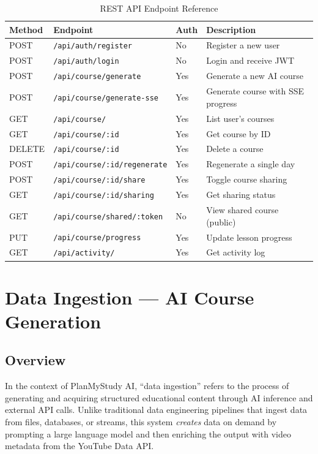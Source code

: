 \documentclass[12pt,a4paper]{report}
\begin{document}
\begin{table}[H]
\centering
\caption{REST API Endpoint Reference}
\label{tab:api-endpoints}
\begin{tabularx}{\textwidth}{l l l X}
\toprule
\textbf{Method} & \textbf{Endpoint} & \textbf{Auth} & \textbf{Description} \\
\midrule
POST & \texttt{/api/auth/register}      & No  & Register a new user \\
POST & \texttt{/api/auth/login}         & No  & Login and receive JWT \\
\midrule
POST & \texttt{/api/course/generate}    & Yes & Generate a new AI course \\
POST & \texttt{/api/course/generate-sse} & Yes & Generate course with SSE progress \\
GET  & \texttt{/api/course/}             & Yes & List user's courses \\
GET  & \texttt{/api/course/:id}          & Yes & Get course by ID \\
DELETE & \texttt{/api/course/:id}        & Yes & Delete a course \\
POST & \texttt{/api/course/:id/regenerate} & Yes & Regenerate a single day \\
POST & \texttt{/api/course/:id/share}    & Yes & Toggle course sharing \\
GET  & \texttt{/api/course/:id/sharing}  & Yes & Get sharing status \\
GET  & \texttt{/api/course/shared/:token} & No  & View shared course (public) \\
\midrule
PUT  & \texttt{/api/course/progress}     & Yes & Update lesson progress \\
GET  & \texttt{/api/activity/}            & Yes & Get activity log \\
\bottomrule
\end{tabularx}
\end{table}


\chapter{Data Ingestion — AI Course Generation}

\section{Overview}
In the context of PlanMyStudy AI, ``data ingestion'' refers to the process of generating and acquiring structured educational content through AI inference and external API calls. Unlike traditional data engineering pipelines that ingest data from files, databases, or streams, this system \emph{creates} data on demand by prompting a large language model and then enriching the output with video metadata from the YouTube Data API.
\end{document}
